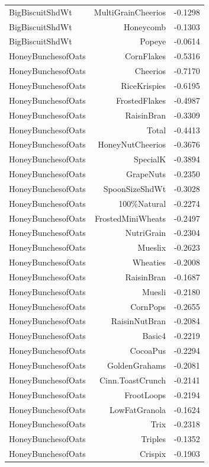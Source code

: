 \begin{longtable}{@{}lrr@{}}
BigBiscuitShdWt & MultiGrainCheerios & -0.1298 \\
BigBiscuitShdWt & Honeycomb & -0.1303 \\
BigBiscuitShdWt & Popeye & -0.0614 \\
HoneyBunchesofOats & CornFlakes & -0.5316 \\
HoneyBunchesofOats & Cheerios & -0.7170 \\
HoneyBunchesofOats & RiceKrispies & -0.6195 \\
HoneyBunchesofOats & FrostedFlakes & -0.4987 \\
HoneyBunchesofOats & RaisinBran & -0.3309 \\
HoneyBunchesofOats & Total & -0.4413 \\
HoneyBunchesofOats & HoneyNutCheerios & -0.3676 \\
HoneyBunchesofOats & SpecialK & -0.3894 \\
HoneyBunchesofOats & GrapeNuts & -0.2350 \\
HoneyBunchesofOats & SpoonSizeShdWt & -0.3028 \\
HoneyBunchesofOats & 100\%Natural & -0.2274 \\
HoneyBunchesofOats & FrostedMiniWheats & -0.2497 \\
HoneyBunchesofOats & NutriGrain & -0.2304 \\
HoneyBunchesofOats & Mueslix & -0.2623 \\
HoneyBunchesofOats & Wheaties & -0.2008 \\
HoneyBunchesofOats & RaisinBran & -0.1687 \\
HoneyBunchesofOats & Muesli & -0.2180 \\
HoneyBunchesofOats & CornPops & -0.2655 \\
HoneyBunchesofOats & RaisinNutBran & -0.2084 \\
HoneyBunchesofOats & Basic4 & -0.2219 \\
HoneyBunchesofOats & CocoaPus & -0.2294 \\
HoneyBunchesofOats & GoldenGrahams & -0.2081 \\
HoneyBunchesofOats & Cinn.ToastCrunch & -0.2141 \\
HoneyBunchesofOats & FrootLoops & -0.2194 \\
HoneyBunchesofOats & LowFatGranola & -0.1624 \\
HoneyBunchesofOats & Trix & -0.2318 \\
HoneyBunchesofOats & Triples & -0.1352 \\
HoneyBunchesofOats & Crispix & -0.1903 \\

\end{longtable}
